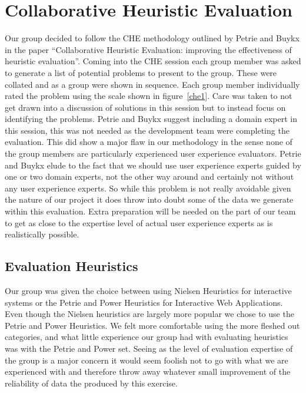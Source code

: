 \section{Collaborative Heuristic Evaluation}
Our group decided to follow the CHE methodology outlined by Petrie and Buykx in the paper “Collaborative Heuristic Evaluation: improving the effectiveness of heuristic evaluation”. Coming into the CHE session each group member was asked to generate a list of potential problems to present to the group. These were collated and as a group were shown in sequence. Each group member individually rated the problem using the scale shown in figure~\ref{che1}. Care was taken to not get drawn into a discussion of solutions in this session but to instead focus on identifying the problems. Petrie and Buykx suggest including a domain expert in this session, this was not needed as the development team were completing the evaluation. This did show a major flaw in our methodology in the sense none of the group members are particularly experienced user experience evaluators. Petrie and Buykx elude to the fact that we should use user experience experts guided by one or two domain experts, not the other way around and certainly not without any user experience experts. So while this problem is not really avoidable given the nature of our project it does throw into doubt some of the data we generate within this evaluation. Extra preparation will be needed on the part of our team to get as close to the expertise level of actual user experience experts as is realistically possible.

\subsection{Evaluation Heuristics}
Our group was given the choice between using Nielsen Heuristics for interactive systems or the Petrie and Power Heuristics for Interactive Web Applications. Even though the Nielsen heuristics are largely more popular we chose to use the Petrie and Power Heuristics. We felt more comfortable using the more fleshed out categories, and what little experience our group had with evaluating heuristics was with the Petrie and Power set. Seeing as the level of evaluation expertise of the group is a major concern it would seem foolish not to go with what we are experienced with and therefore throw away whatever small improvement of the reliability of data the produced by this exercise.

